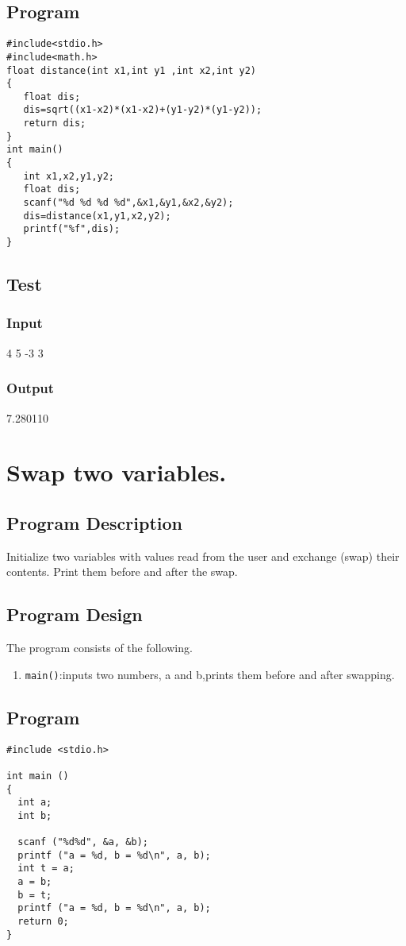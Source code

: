 \documentclass[11pt]{article}
\begin{document}
\subsection*{Program}
\label{sec-6-4}

\begin{verbatim}
#include<stdio.h>
#include<math.h>
float distance(int x1,int y1 ,int x2,int y2)
{
   float dis;
   dis=sqrt((x1-x2)*(x1-x2)+(y1-y2)*(y1-y2));
   return dis;
}
int main()
{
   int x1,x2,y1,y2;
   float dis;
   scanf("%d %d %d %d",&x1,&y1,&x2,&y2);
   dis=distance(x1,y1,x2,y2);
   printf("%f",dis);
}
\end{verbatim}
\subsection*{Test}
\label{sec-6-5}
\subsubsection*{Input}
\label{sec-6-5-1}
4 5 -3 3
\subsubsection*{Output}
\label{sec-6-5-2}
7.280110
\section{Swap two variables.}
\label{sec-7}

\subsection*{Program Description}
\label{sec-7-1}
Initialize two variables with values read from the user and exchange (swap) their contents. Print them before and after the swap.

\subsection*{Program Design}
\label{sec-7-2}
The program consists of the following.
\begin{enumerate}
\item \texttt{main()}:inputs two numbers, a and b,prints them before and after swapping.
\end{enumerate}

\subsection*{Program}
\label{sec-7-3}
\begin{verbatim}
#include <stdio.h>

int main ()
{
  int a;
  int b;

  scanf ("%d%d", &a, &b);
  printf ("a = %d, b = %d\n", a, b);
  int t = a;
  a = b;
  b = t;
  printf ("a = %d, b = %d\n", a, b);  
  return 0;
}
\end{verbatim}
\end{document}
